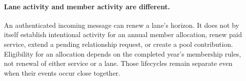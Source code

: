 \documentclass[11pt]{article}
\begin{document}
\paragraph{Lane activity and member activity are different.}
An authenticated incoming message can renew a lane's horizon. It does not by
itself establish intentional activity for an annual member allocation, renew
paid service, extend a pending relationship request, or create a pool contribution.
Eligibility for an allocation depends on the completed year's membership rules,
not renewal of either service or a lane. Those lifecycles remain separate even
when their events occur close together.
\end{document}
